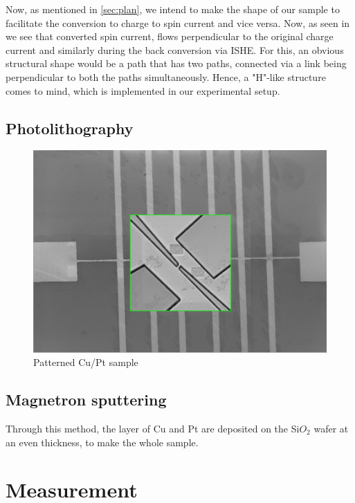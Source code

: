 Now, as mentioned in \cref{sec:plan}, we intend to make the shape of our sample to facilitate the conversion to charge to spin current and vice versa.
Now, as seen in %
we see that converted spin current, flows perpendicular to the original charge current and similarly during the back conversion via ISHE.
For this, an obvious structural shape would be a path that has two paths, connected via a link being perpendicular to both the paths simultaneously.
Hence, a "H"-like structure comes to mind, which is implemented in our experimental setup.

\subsection{Photolithography}

\begin{figure}[h!]
    \includegraphics[width=\columnwidth]{newtrack.png}
    \caption{Patterned Cu/Pt sample}
\end{figure}

\subsection{Magnetron sputtering}

Through this method, the layer of Cu and Pt are deposited on the Si$O_2$ wafer at an even thickness, to make the whole sample.



\section{Measurement}

